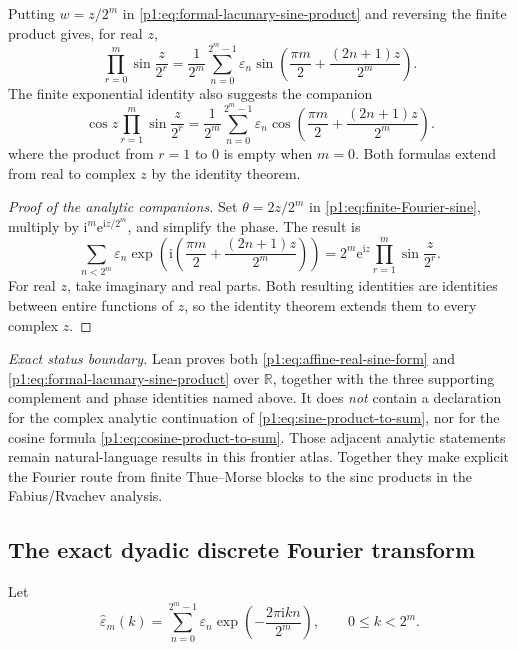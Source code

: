 \documentclass[11pt,oneside]{article}
\numberwithin{equation}{section}
\theoremstyle{definition}
\theoremstyle{remark}
\newcommand{\R}{\mathbb R}
\newcommand{\e}{\mathrm e}
\newcommand{\ii}{\mathrm i}
\newcommand{\eps}{\varepsilon}
\begin{document}
Putting \(w=z/2^m\) in \eqref{p1:eq:formal-lacunary-sine-product} and reversing
the finite product gives, for real \(z\),
\begin{equation}
  \boxed{
  \prod_{r=0}^{m}\sin\frac{z}{2^r}
  =\frac1{2^m}\sum_{n=0}^{2^m-1}\eps_n
   \sin\!\left(
     \frac{\pi m}{2}+\frac{(2n+1)z}{2^m}
   \right).}
  \label{p1:eq:sine-product-to-sum}
\end{equation}
The finite exponential identity also suggests the companion
\begin{equation}
  \boxed{
  \cos z\prod_{r=1}^{m}\sin\frac{z}{2^r}
  =\frac1{2^m}\sum_{n=0}^{2^m-1}\eps_n
   \cos\!\left(
     \frac{\pi m}{2}+\frac{(2n+1)z}{2^m}
   \right).}
  \label{p1:eq:cosine-product-to-sum}
\end{equation}
where the product from \(r=1\) to \(0\) is empty when \(m=0\).
Both formulas extend from real to complex \(z\) by the identity theorem.

\begin{proof}[Proof of the analytic companions]
Set \(\theta=2z/2^m\) in
\eqref{p1:eq:finite-Fourier-sine}, multiply by
\(\ii^m\e^{\ii z/2^m}\), and simplify the phase.  The result is
\[
 \sum_{n<2^m}\eps_n
 \exp\!\left(\ii\left(
   \frac{\pi m}{2}+\frac{(2n+1)z}{2^m}
 \right)\right)
 =2^m\e^{\ii z}\prod_{r=1}^{m}\sin\frac z{2^r}.
\]
For real \(z\), take imaginary and real parts.  Both resulting identities
are identities between entire functions of \(z\), so the identity theorem
extends them to every complex \(z\).
\end{proof}

\emph{Exact status boundary.}  Lean proves both
\eqref{p1:eq:affine-real-sine-form} and
\eqref{p1:eq:formal-lacunary-sine-product} over \(\R\), together with the three
supporting complement and phase identities named above.  It does \emph{not}
contain a declaration for the complex analytic continuation of
\eqref{p1:eq:sine-product-to-sum}, nor for the cosine formula
\eqref{p1:eq:cosine-product-to-sum}.  Those adjacent analytic statements remain
natural-language results in this frontier atlas.  Together they make explicit
the Fourier route from finite Thue--Morse blocks to the sinc products in the
Fabius/Rvachev analysis.

\subsection{The exact dyadic discrete Fourier transform}

Let
\begin{equation}
  \widehat\eps_m(k)=
  \sum_{n=0}^{2^m-1}\eps_n
  \exp\!\left(-\frac{2\pi\ii kn}{2^m}\right),
  \qquad 0\le k<2^m.
  \label{p1:eq:DFT-definition}
\end{equation}
\end{document}
